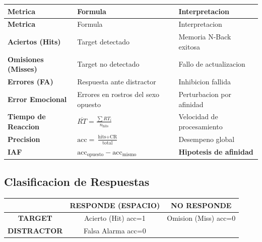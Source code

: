 \documentclass[12pt,a4paper]{article}
\begin{document}
\begin{longtable}{>{\bfseries}p{3.8cm} p{4.5cm} p{5cm}}
\toprule
Metrica & Formula & Interpretacion \\
\midrule
\endfirsthead
\toprule
Metrica & Formula & Interpretacion \\
\midrule
\endhead
\bottomrule
\endfoot
Aciertos (Hits) &
  Target detectado & Memoria N-Back exitosa \\[0.4em]

Omisiones (Misses) &
  Target no detectado & Fallo de actualizacion \\[0.4em]

Errores (FA) &
  Respuesta ante distractor & Inhibicion fallida \\[0.4em]

Error Emocional &
  Errores en rostros del sexo opuesto & Perturbacion por afinidad \\[0.4em]

Tiempo de Reaccion &
  $\overline{RT} = \frac{\sum RT_i}{n_{\text{hits}}}$ & Velocidad de procesamiento \\[0.4em]

Precision &
  $\text{acc} = \frac{\text{hits}+\text{CR}}{\text{total}}$ & Desempeno global \\[0.4em]

\textbf{IAF} &
  $\text{acc}_{\text{opuesto}} - \text{acc}_{\text{mismo}}$ &
  \textbf{Hipotesis de afinidad} \\
\end{longtable}

\subsection{Clasificacion de Respuestas}

\begin{center}
\renewcommand{\arraystretch}{1.5}
\begin{tabular}{|c|c|c|}
\hline
\rowcolor{primary!15}
& \textbf{RESPONDE (ESPACIO)} & \textbf{NO RESPONDE} \\
\hline
\textbf{TARGET} &
\cellcolor{success!20}\textcolor{success!70!black}{Acierto (Hit) acc=1} &
\cellcolor{errorred!20}\textcolor{errorred!70!black}{Omision (Miss) acc=0} \\
\hline
\textbf{DISTRACTOR} &
\cellcolor{warnyellow!20}\textcolor{warnyellow!70!black}{Falsa Alarma acc=0} &
\cellcolor{gray!15}{Rechazo Correcto acc=1} \\
\hline
\end{tabular}
\end{center}
\end{document}
